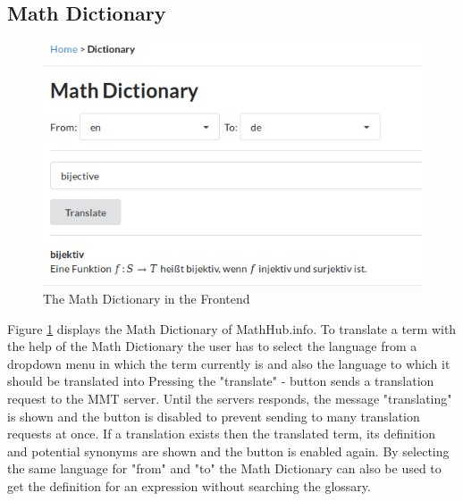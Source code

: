 \documentclass[11pt,a4paper]{article}
\begin{document}
\subsection{Math Dictionary}
\begin{figure}[H]
\includegraphics[width=1\textwidth]{dictionary.png}
\caption{The Math Dictionary in the Frontend}
\label{fig:dict}
\end{figure}
Figure \ref{fig:dict} displays the Math Dictionary of MathHub.info.
To translate a term with the help of the Math Dictionary the user has to select the language from a dropdown menu in which the term currently is and also the language to which it should be translated into
Pressing the "translate" - button sends a translation request to the MMT server.
Until the servers responds, the message "translating" is shown and the button is disabled to prevent sending to many translation requests at once.
If a translation exists then the translated term, its definition and potential synonyms are shown and the button is enabled again.
By selecting the same language for "from" and "to" the Math Dictionary can also be used to get the definition for an expression without searching the glossary.
\end{document}
